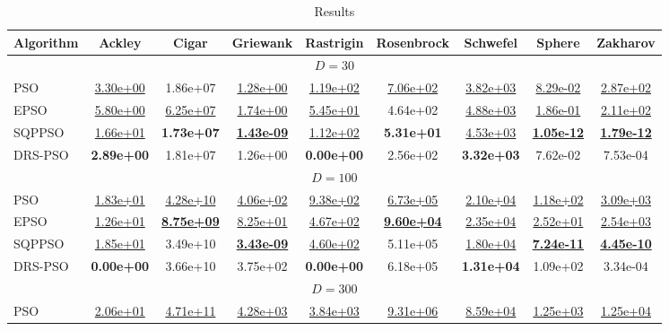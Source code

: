 \begin{table}
\centering
\caption{Results}
\label{tab:results}
\begin{tabular}{lcccccccc}
\toprule
Algorithm & Ackley & Cigar & Griewank & Rastrigin & Rosenbrock & Schwefel & Sphere & Zakharov \\
\midrule\multicolumn{9}{c}{ $D = 30$ }\\ \midrule
PSO & {\underline{3.30e+00}} & {1.86e+07} & {\underline{1.28e+00}} & {\underline{1.19e+02}} & {\underline{7.06e+02}} & {\underline{3.82e+03}} & {\underline{8.29e-02}} & {\underline{2.87e+02}} \\
EPSO & {\underline{5.80e+00}} & {\underline{6.25e+07}} & {\underline{1.74e+00}} & {\underline{5.45e+01}} & {4.64e+02} & {\underline{4.88e+03}} & {\underline{1.86e-01}} & {\underline{2.11e+02}} \\
SQPPSO & {\underline{1.66e+01}} & \textbf{1.73e+07} & \textbf{\underline{1.43e-09}} & {\underline{1.12e+02}} & \textbf{5.31e+01} & {\underline{4.53e+03}} & \textbf{\underline{1.05e-12}} & \textbf{\underline{1.79e-12}} \\
DRS-PSO & \textbf{2.89e+00} & {1.81e+07} & {1.26e+00} & \textbf{0.00e+00} & {2.56e+02} & \textbf{3.32e+03} & {7.62e-02} & {7.53e-04} \\
\midrule\multicolumn{9}{c}{ $D = 100$ }\\ \midrule
PSO & {\underline{1.83e+01}} & {\underline{4.28e+10}} & {\underline{4.06e+02}} & {\underline{9.38e+02}} & {\underline{6.73e+05}} & {\underline{2.10e+04}} & {\underline{1.18e+02}} & {\underline{3.09e+03}} \\
EPSO & {\underline{1.26e+01}} & \textbf{\underline{8.75e+09}} & {\underline{8.25e+01}} & {\underline{4.67e+02}} & \textbf{\underline{9.60e+04}} & {\underline{2.35e+04}} & {\underline{2.52e+01}} & {\underline{2.54e+03}} \\
SQPPSO & {\underline{1.85e+01}} & {3.49e+10} & \textbf{\underline{3.43e-09}} & {\underline{4.60e+02}} & {5.11e+05} & {\underline{1.80e+04}} & \textbf{\underline{7.24e-11}} & \textbf{\underline{4.45e-10}} \\
DRS-PSO & \textbf{0.00e+00} & {3.66e+10} & {3.75e+02} & \textbf{0.00e+00} & {6.18e+05} & \textbf{1.31e+04} & {1.09e+02} & {3.34e-04} \\
\midrule\multicolumn{9}{c}{ $D = 300$ }\\ \midrule
PSO & {\underline{2.06e+01}} & {\underline{4.71e+11}} & {\underline{4.28e+03}} & {\underline{3.84e+03}} & {\underline{9.31e+06}} & {\underline{8.59e+04}} & {\underline{1.25e+03}} & {\underline{1.25e+04}} \\

\end{tabular}
\end{table}
